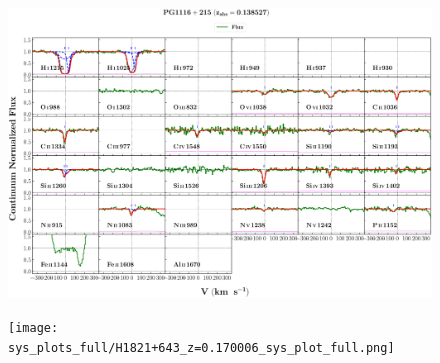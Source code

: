 \documentclass[12pt]{report}
\begin{document}
\begin{landscape}

    \begin{figure}
        \centering
        \vspace{-20mm}
        \hspace*{-35mm}
        \includegraphics[width=1.25\linewidth]{sys_plots_full/PG1116+215_z=0.138527_sys_plot_full.png}
    \end{figure}
    
\end{landscape}


\begin{landscape}

    \begin{figure}
        \centering
        \vspace{-20mm}
        \hspace*{-35mm}
        \texttt{[image: sys\_plots\_full/H1821+643\_z=0.170006\_sys\_plot\_full.png]}
    \end{figure}
    
\end{landscape}
\end{document}
